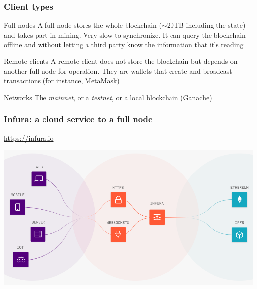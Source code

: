 \documentclass[11pt]{beamer}  %
\begin{document}
\begin{frame}\frametitle{Client types}

  \begin{greenbox}{Full nodes}
    A full node stores the whole blockchain ($\sim$20TB including the state) and
    takes part in mining. Very slow to synchronize.
    It can query the blockchain offline and
    without letting a third party know the information that it's reading
  \end{greenbox}

  \bigskip

  \begin{greenbox}{Remote clients}
    A remote client does not store the blockchain but
    depends on another full node for operation. They are wallets
    that create and broadcast transactions (for instance, MetaMask)
  \end{greenbox}

  \bigskip

  \begin{greenbox}{Networks}
    The \emph{mainnet}, or a \emph{testnet}, or a local blockchain (Ganache)
  \end{greenbox}
  
\end{frame}

\begin{frame}\frametitle{Infura: a cloud service to a full node}

  \url{https://infura.io}

  \begin{center}
    \includegraphics[width=\textwidth,clip=false]{pictures/infura.png}
  \end{center}

\end{frame}
\end{document}
